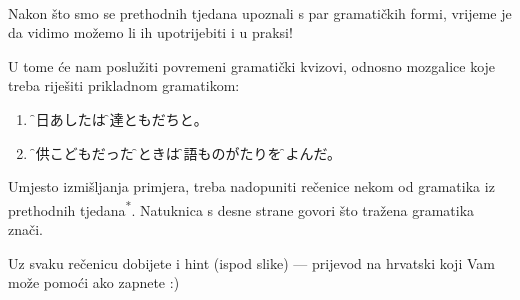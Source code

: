\documentclass[intermediate]{grampig}
\begin{document}
	\onehalfspacing
	{\Large {}} \\[-0.5em]
	
	Nakon što smo se prethodnih tjedana upoznali s par gramatičkih formi, vrijeme je da vidimo možemo li ih upotrijebiti i u praksi!\vspace{1em}
	
	U tome će nam poslužiti povremeni gramatički kvizovi, odnosno mozgalice koje treba riješiti prikladnom gramatikom:\vspace{1em}
	\begin{enumerate}\singlespacing
		\item \f{明日}{あした}は\f{友達}{ともだち}と。 \hfill {} \vspace{0.5em}
		\item \f{子供}{こども}だった\f{時}{とき}は\f{物語}{ものがたり}を\f{読}{よ}んだ。 \hfill {}
	\end{enumerate}\vspace{1em}
	
	Umjesto izmišljanja primjera, treba nadopuniti rečenice nekom od gramatika iz prethodnih tjedana\textsuperscript{*}.
	Natuknica s desne strane govori što tražena gramatika znači.
	\vspace{1em}
	
	 Uz svaku rečenicu dobijete i hint (ispod slike) --- prijevod na hrvatski koji Vam može pomoći ako zapnete :)\vspace{1em}
	\begin{center}
	\end{center}
	
\end{document}
